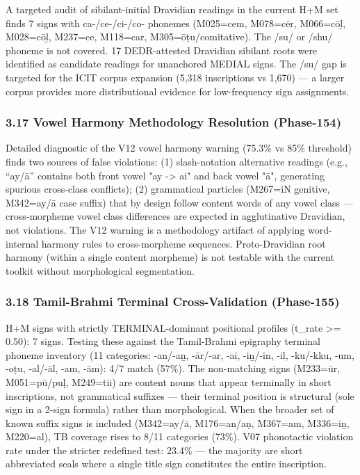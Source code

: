 \documentclass[
]{article}
\begin{document}
A targeted audit of sibilant-initial Dravidian readings in the current
H+M set finds 7 signs with ca-/ce-/ci-/co- phonemes (M025=cem, M078=cēr,
M066=cōḻ, M028=cōḻ, M237=ce, M118=car, M305=ōṭu/comitative). The /su/ or
/shu/ phoneme is not covered. 17 DEDR-attested Dravidian sibilant roots
were identified as candidate readings for unanchored MEDIAL signs. The
/su/ gap is targeted for the ICIT corpus expansion (5,318 inscriptions
vs 1,670) --- a larger corpus provides more distributional evidence for
low-frequency sign assignments.

\subsubsection{3.17 Vowel Harmony Methodology Resolution
(Phase-154)}\label{vowel-harmony-methodology-resolution-phase-154}

Detailed diagnostic of the V12 vowel harmony warning (75.3\% vs 85\%
threshold) finds two sources of false violations: (1) slash-notation
alternative readings (e.g., ``ay/ā'' contains both front vowel "ay -\textgreater{} ai"
and back vowel "ā", generating spurious cross-class conflicts); (2)
grammatical particles (M267=iN genitive, M342=ay/ā case suffix) that by
design follow content words of any vowel class --- cross-morpheme vowel
class differences are expected in agglutinative Dravidian, not
violations. The V12 warning is a methodology artifact of applying
word-internal harmony rules to cross-morpheme sequences. Proto-Dravidian
root harmony (within a single content morpheme) is not testable with the
current toolkit without morphological segmentation.

\subsubsection{3.18 Tamil-Brahmi Terminal Cross-Validation
(Phase-155)}\label{tamil-brahmi-terminal-cross-validation-phase-155}

H+M signs with strictly TERMINAL-dominant positional profiles (t\_rate \textgreater{}=
0.50): 7 signs. Testing these against the Tamil-Brahmi epigraphy
terminal phoneme inventory (11 categories: -an/-aṉ, -ār/-ar, -ai,
-iṉ/-in, -il, -ku/-kku, -um, -oṭu, -al/-āl, -am, -ām): 4/7 match (57\%).
The non-matching signs (M233=ūr, M051=pū/puḷ, M249=tii) are content
nouns that appear terminally in short inscriptions, not grammatical
suffixes --- their terminal position is structural (sole sign in a
2-sign formula) rather than morphological. When the broader set of known
suffix signs is included (M342=ay/ā, M176=an/aṇ, M367=am, M336=iṉ,
M220=al), TB coverage rises to 8/11 categories (73\%). V07 phonotactic
violation rate under the stricter redefined test: 23.4\% --- the
majority are short abbreviated seals where a single title sign
constitutes the entire inscription.
\end{document}
